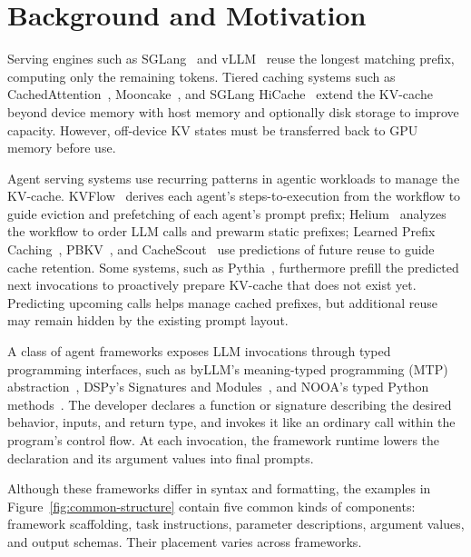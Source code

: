 \section{Background and Motivation}
\label{sec:bg_mt}
Serving engines such as SGLang~\cite{zheng2024sglang} and vLLM~\cite{kwon2023pagedattention} reuse the longest matching prefix, computing only the remaining tokens. Tiered caching systems such as CachedAttention~\cite{gao2024cachedattention}, Mooncake~\cite{qin2025mooncake}, and SGLang HiCache~\cite{sglang2026hicache} extend the KV-cache beyond device memory with host memory and optionally disk storage to improve capacity. However, off-device KV states must be transferred back to GPU memory before use.


Agent serving systems use recurring patterns in agentic workloads to manage the KV-cache. KVFlow~\cite{pan2025kvflow} derives each agent's steps-to-execution from the workflow to guide eviction and prefetching of each agent's prompt prefix; Helium~\cite{wadlom2026helium} analyzes the workflow to order LLM calls and prewarm static prefixes; Learned Prefix Caching~\cite{yang2025lpc}, PBKV~\cite{zheng2026pbkv}, and CacheScout~\cite{zhang2026cachescout} use predictions of future reuse to guide cache retention. Some systems, such as Pythia~\cite{yu2026pythia}, furthermore prefill the predicted next invocations to proactively prepare KV-cache that does not exist yet. Predicting upcoming calls helps manage cached prefixes, but additional reuse may remain hidden by the existing prompt layout.



A class of agent frameworks exposes LLM invocations through typed programming interfaces, such as byLLM's meaning-typed programming (MTP) abstraction~\cite{dantanarayana2025mtp}, DSPy's Signatures and Modules~\cite{khattab2024dspy}, and NOOA's typed Python methods~\cite{furgale2026nooa}. The developer declares a function or signature describing the desired behavior, inputs, and return type, and invokes it like an ordinary call within the program's control flow. At each invocation, the framework runtime lowers the declaration and its argument values into final prompts.



Although these frameworks differ in syntax and formatting, the examples in Figure~\ref{fig:common-structure} contain five common kinds of components: framework scaffolding, task instructions, parameter descriptions, argument values, and output schemas. Their placement varies across frameworks.


